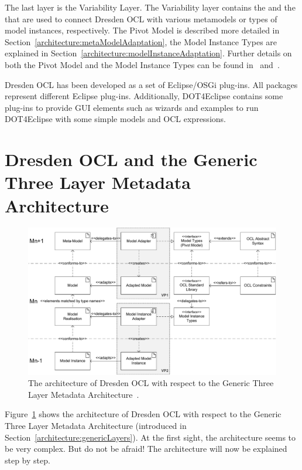 The last layer is the Variability Layer. The Variability layer contains the
 and the  that are used to
connect Dresden OCL with various metamodels or types of model instances,
respectively. The Pivot Model is described more detailed in
Section~\ref{architecture:metaModelAdaptation}, the Model Instance Types are
explained in Section~\ref{architecture:modelInstanceAdaptation}. Further details
on both the Pivot Model and the Model Instance Types can be found 
in~\cite{braeuerEA:OCL2007} and~\cite{wilkeEA:MODELS2010}.

Dresden OCL has been developed as a set of Eclipse/\acs{OSGi} plug-ins. All
packages represent different Eclipse plug-ins. Additionally, \acl{DOT4Eclipse}
contains some plug-ins to provide \acs{GUI} elements such as wizards and 
examples to run \acl{DOT4Eclipse} with some simple models and OCL expressions.



\section{Dresden OCL and the Generic Three La\-yer Me\-ta\-da\-ta Architecture}
\label{theory:DOTLayers}

\begin{figure}
	\centering
	\includegraphics[width=1.0\linewidth]{figures/architecture/modeladaptation}
	\caption{The architecture of Dresden OCL with respect to the Generic Three Layer
	Metadata Architecture~\cite{wilkeEA:MODELS2010}.}
	\label{pic:architecture:genericArchitecture}
\end{figure}

Figure~\ref{pic:architecture:genericArchitecture} shows the architecture of 
Dresden OCL with respect to the Generic Three Layer Metadata Architecture
(introduced in Section~\ref{architecture:genericLayers}). At the first sight, 
the architecture seems to be very complex. But do not be afraid! The 
architecture will now be explained step by step.


